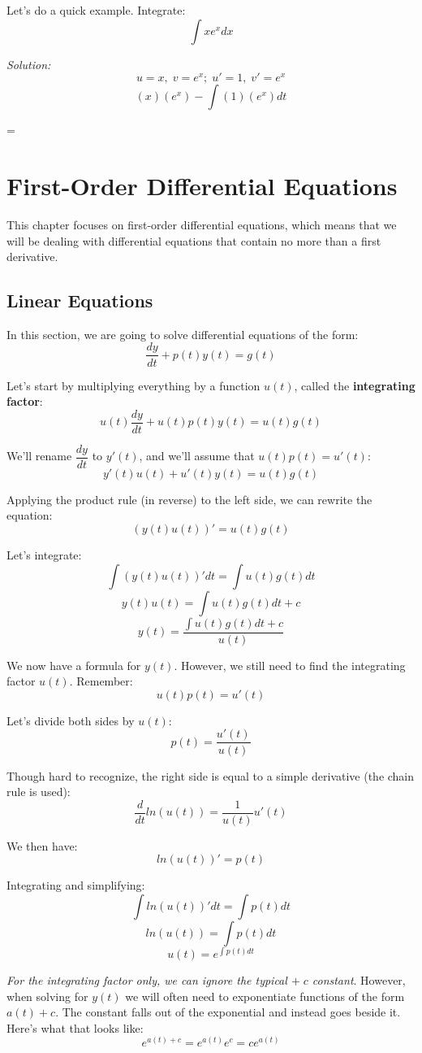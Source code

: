 Let's do a quick example. Integrate:
$$\int xe^{x}dx$$

\textit{Solution:}
$$u = x,\; v = e^{x};\; u' = 1,\; v' = e^{x}$$
$$(x)(e^{x}) - \int (1)(e^{x})dt$$
\begin{center}
	= 
\end{center}

\pagebreak

\section{First-Order Differential Equations}
This chapter focuses on first-order differential equations, which means that we will be dealing with differential equations that contain no more than a first derivative.
\subsection{Linear Equations} \label{linear equations}
In this section, we are going to solve differential equations of the form:
$$\frac{dy}{dt} + p(t)y(t) = g(t)$$

Let's start by multiplying everything by a function $u(t)$, called the \textbf{integrating factor}:
$$u(t)\frac{dy}{dt} + u(t)p(t)y(t) = u(t)g(t)$$

We'll rename $\dfrac{dy}{dt}$ to $y'(t)$, and we'll assume that $u(t)p(t)=u'(t)$:
$$y'(t)u(t) + u'(t)y(t) = u(t)g(t)$$

Applying the product rule (in reverse) to the left side, we can rewrite the equation: $$(y(t)u(t))' = u(t)g(t)$$

Let's integrate:
$$\int (y(t)u(t))'dt = \int u(t)g(t)dt$$
$$y(t)u(t) = \int u(t)g(t)dt + c$$
$$y(t) = \frac{\int u(t)g(t)dt + c}{u(t)}$$

We now have a formula for $y(t)$. However, we still need to find the integrating factor $u(t)$. Remember: $$u(t)p(t)=u'(t)$$

Let's divide both sides by $u(t)$: $$p(t) = \frac{u'(t)}{u(t)}$$

Though hard to recognize, the right side is equal to a simple derivative (the chain rule is used):
$$\frac{d}{dt}ln(u(t)) = \frac{1}{u(t)}u'(t)$$

We then have: $$ln(u(t))' = p(t)$$

Integrating and simplifying:
$$\int ln(u(t))'dt = \int p(t)dt$$
$$ln(u(t)) = \int p(t)dt$$
$$u(t) = e^{\int p(t)dt}$$

\textit{For the integrating factor only, we can ignore the typical $+\; c$ constant}. However, when solving for $y(t)$ we will often need to exponentiate functions of the form $a(t) + c$. The constant falls out of the exponential and instead goes beside it. Here's what that looks like:
$$e^{a(t) + c} = e^{a(t)}e^{c} = ce^{a(t)}$$

